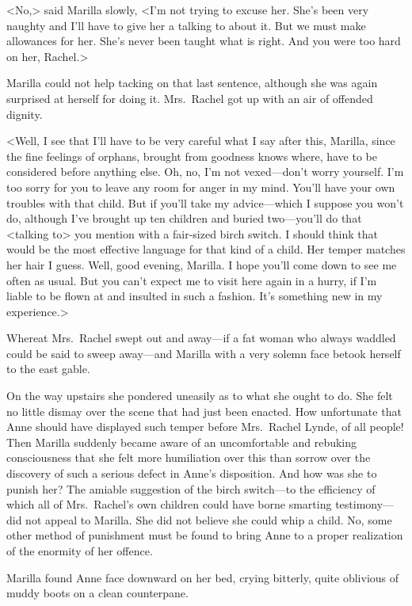 <No,> said Marilla slowly, <I'm not trying to excuse her. She's been very naughty and I'll have to give her a talking to about it. But we must make allowances for her. She's never been taught what is right. And you were too hard on her, Rachel.>

Marilla could not help tacking on that last sentence, although she was again surprised at herself for doing it. Mrs.~Rachel got up with an air of offended dignity.

<Well, I see that I'll have to be very careful what I say after this, Marilla, since the fine feelings of orphans, brought from goodness knows where, have to be considered before anything else. Oh, no, I'm not vexed—don't worry yourself. I'm too sorry for you to leave any room for anger in my mind. You'll have your own troubles with that child. But if you'll take my advice—which I suppose you won't do, although I've brought up ten children and buried two—you'll do that <talking to> you mention with a fair-sized birch switch. I should think that would be the most effective language for that kind of a child. Her temper matches her hair I guess. Well, good evening, Marilla. I hope you'll come down to see me often as usual. But you can't expect me to visit here again in a hurry, if I'm liable to be flown at and insulted in such a fashion. It's something new in my experience.>

Whereat Mrs.~Rachel swept out and away—if a fat woman who always waddled could be said to sweep away—and Marilla with a very solemn face betook herself to the east gable.

On the way upstairs she pondered uneasily as to what she ought to do. She felt no little dismay over the scene that had just been enacted. How unfortunate that Anne should have displayed such temper before Mrs.~Rachel Lynde, of all people! Then Marilla suddenly became aware of an uncomfortable and rebuking consciousness that she felt more humiliation over this than sorrow over the discovery of such a serious defect in Anne's disposition. And how was she to punish her? The amiable suggestion of the birch switch—to the efficiency of which all of Mrs.~Rachel's own children could have borne smarting testimony—did not appeal to Marilla. She did not believe she could whip a child. No, some other method of punishment must be found to bring Anne to a proper realization of the enormity of her offence.

Marilla found Anne face downward on her bed, crying bitterly, quite oblivious of muddy boots on a clean counterpane.

